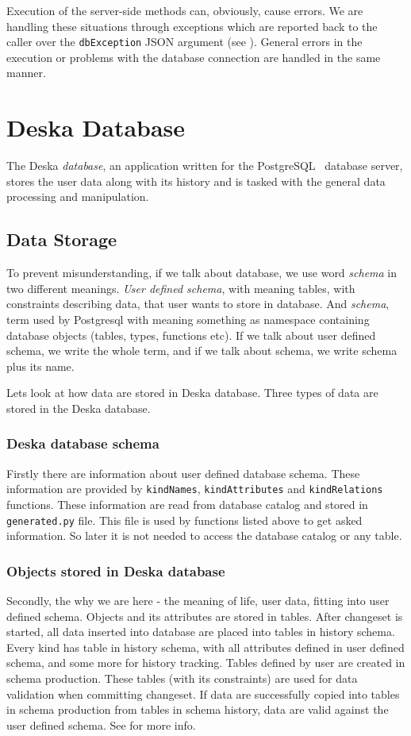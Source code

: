 \documentclass[deska]{subfiles}
\begin{document}
Execution of the server-side methods can, obviously, cause errors.  We are handling these situations through exceptions
which are reported back to the caller over the {\tt dbException} JSON argument (see ).
General errors in the execution or problems with the database connection are handled in the same manner.

\section{Deska Database}

The Deska {\em database}, an application written for the PostgreSQL~\cite{postgresql} database server, stores the user
data along with its history and is tasked with the general data processing and manipulation.

\subsection{Data Storage}
To prevent misunderstanding, if we talk about database, we use word {\em schema} in two different meanings. {\em User defined schema},
with meaning tables, with constraints describing data, that user wants to store in database. And {\em schema}, term used by
Postgresql with meaning something as namespace containing database objects (tables, types, functions etc).
If we talk about user defined schema, we write the whole term, and if we talk about schema, we write
schema plus its name.

Lets look at how data are stored in Deska database. Three types of data are stored in the Deska database.

\subsubsection{Deska database schema} 
Firstly there are information about user defined database schema. These information are provided by {\tt kindNames}, {\tt kindAttributes} and {\tt kindRelations} functions.
These information are read from database catalog and stored in {\tt generated.py} file. This file is used by functions listed above to get asked information. So later it is not needed to access the database catalog or any table.

\subsubsection{Objects stored in Deska database}
Secondly, the why we are here - the meaning of life, user data, fitting into user defined schema.
Objects and its attributes are stored in tables. 
After changeset is started, all data inserted into database are placed into tables in history schema. Every kind has table in history
schema, with all attributes defined in user defined schema, and some more for history tracking.
Tables defined by user are created in schema production. These tables
(with its constraints) are used for data validation when committing changeset. If data are successfully copied into tables in schema production
from tables in schema history, data are valid against the user defined schema.
See  for more info.
\end{document}

